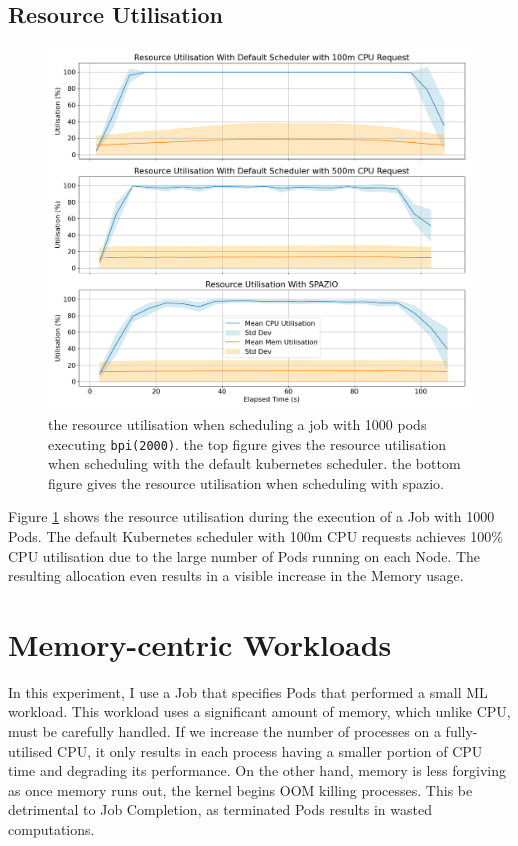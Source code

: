 \subsection{Resource Utilisation}
\begin{figure}[h]
    \centering
    \includegraphics[width=\textwidth]{images/pi-util.png}
    \caption{the resource utilisation when scheduling a job with 1000 pods
    executing \texttt{bpi(2000)}. the top figure gives the resource utilisation
    when scheduling with the default kubernetes scheduler. the bottom figure
    gives the resource utilisation when scheduling with spazio.}
    \label{fig:pi-2000-1000x-pod-util}
\end{figure}

Figure \ref{fig:pi-2000-1000x-pod-util} shows the resource utilisation during
the execution of a Job with 1000 Pods. The default Kubernetes scheduler with
100m CPU requests achieves 100\% CPU utilisation due to the large number of Pods
running on each Node. The resulting allocation even results in a visible
increase in the Memory usage.

\section{Memory-centric Workloads}
\label{sec:eval-mem-centric}
In this experiment, I use a Job that specifies Pods that performed a small ML
workload. This workload uses a significant amount of memory, which unlike CPU,
must be carefully handled. If we increase the number of processes on a
fully-utilised CPU, it only results in each process having a smaller portion of
CPU time and degrading its performance. On the other hand, memory is less
forgiving as once memory runs out, the kernel begins OOM killing processes. This
be detrimental to Job Completion, as terminated Pods results in wasted
computations.

